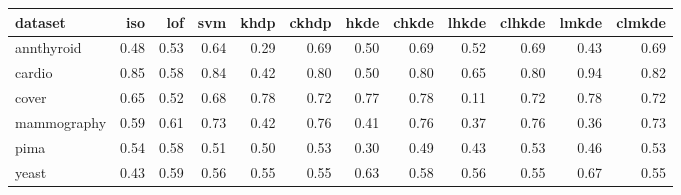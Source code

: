 \begin{tabular}{lrrrrrrrrrrr}
  \hline
dataset & iso & lof & svm & khdp & ckhdp & hkde & chkde & lhkde & clhkde & lmkde & clmkde \\ 
  \hline
annthyroid & 0.48 & 0.53 & 0.64 & 0.29 & 0.69 & 0.50 & 0.69 & 0.52 & 0.69 & 0.43 & 0.69 \\ 
  cardio & 0.85 & 0.58 & 0.84 & 0.42 & 0.80 & 0.50 & 0.80 & 0.65 & 0.80 & 0.94 & 0.82 \\ 
  cover & 0.65 & 0.52 & 0.68 & 0.78 & 0.72 & 0.77 & 0.78 & 0.11 & 0.72 & 0.78 & 0.72 \\ 
  mammography & 0.59 & 0.61 & 0.73 & 0.42 & 0.76 & 0.41 & 0.76 & 0.37 & 0.76 & 0.36 & 0.73 \\ 
  pima & 0.54 & 0.58 & 0.51 & 0.50 & 0.53 & 0.30 & 0.49 & 0.43 & 0.53 & 0.46 & 0.53 \\ 
  yeast & 0.43 & 0.59 & 0.56 & 0.55 & 0.55 & 0.63 & 0.58 & 0.56 & 0.55 & 0.67 & 0.55 \\ 
   \hline
\end{tabular}
